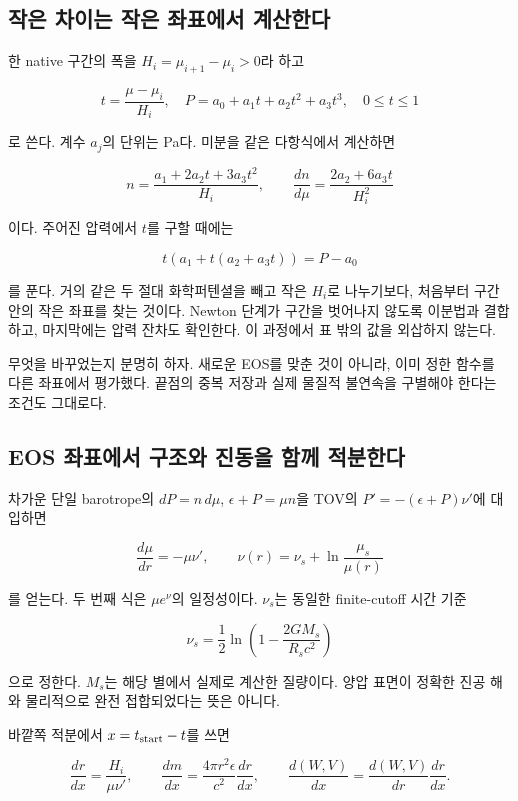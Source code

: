 \documentclass[
  10pt,
  a4paper,
]{article}
\begin{document}
\subsection{작은 차이는 작은 좌표에서
계산한다}\label{uxc791uxc740-uxcc28uxc774uxb294-uxc791uxc740-uxc88cuxd45cuxc5d0uxc11c-uxacc4uxc0b0uxd55cuxb2e4}

한 native 구간의 폭을 \(H_i=\mu_{i+1}-\mu_i>0\)라 하고

\[
t=\frac{\mu-\mu_i}{H_i},\quad
P=a_0+a_1t+a_2t^2+a_3t^3,\quad 0\le t\le1
\]

로 쓴다. 계수 \(a_j\)의 단위는 Pa다. 미분을 같은 다항식에서 계산하면

\[
n=\frac{a_1+2a_2t+3a_3t^2}{H_i},\qquad
\frac{dn}{d\mu}=\frac{2a_2+6a_3t}{H_i^2}
\]

이다. 주어진 압력에서 \(t\)를 구할 때에는

\[
t(a_1+t(a_2+a_3t))=P-a_0
\]

를 푼다. 거의 같은 두 절대 화학퍼텐셜을 빼고 작은 \(H_i\)로 나누기보다,
처음부터 구간 안의 작은 좌표를 찾는 것이다. Newton 단계가 구간을
벗어나지 않도록 이분법과 결합하고, 마지막에는 압력 잔차도 확인한다. 이
과정에서 표 밖의 값을 외삽하지 않는다.

무엇을 바꾸었는지 분명히 하자. 새로운 EOS를 맞춘 것이 아니라, 이미 정한
함수를 다른 좌표에서 평가했다. 끝점의 중복 저장과 실제 물질적 불연속을
구별해야 한다는 조건도 그대로다.

\subsection{EOS 좌표에서 구조와 진동을 함께
적분한다}\label{eos-uxc88cuxd45cuxc5d0uxc11c-uxad6cuxc870uxc640-uxc9c4uxb3d9uxc744-uxd568uxaed8-uxc801uxbd84uxd55cuxb2e4}

차가운 단일 barotrope의 \(dP=n\,d\mu\), \(\epsilon+P=\mu n\)을 TOV의
\(P'=-(\epsilon+P)\nu'\)에 대입하면

\[
\frac{d\mu}{dr}=-\mu\nu',\qquad
\nu(r)=\nu_s+\ln\frac{\mu_s}{\mu(r)}
\]

를 얻는다. 두 번째 식은 \(\mu e^\nu\)의 일정성이다. \(\nu_s\)는 동일한
finite-cutoff 시간 기준

\[
\nu_s=\frac12\ln\left(1-\frac{2GM_s}{R_s c^2}\right)
\]

으로 정한다. \(M_s\)는 해당 별에서 실제로 계산한 질량이다. 양압 표면이
정확한 진공 해와 물리적으로 완전 접합되었다는 뜻은 아니다.

바깥쪽 적분에서 \(x=t_{\rm start}-t\)를 쓰면

\[
\frac{dr}{dx}=\frac{H_i}{\mu\nu'},\qquad
\frac{dm}{dx}=\frac{4\pi r^2\epsilon}{c^2}\frac{dr}{dx},\qquad
\frac{d(W,V)}{dx}=\frac{d(W,V)}{dr}\frac{dr}{dx}.
\]
\end{document}
